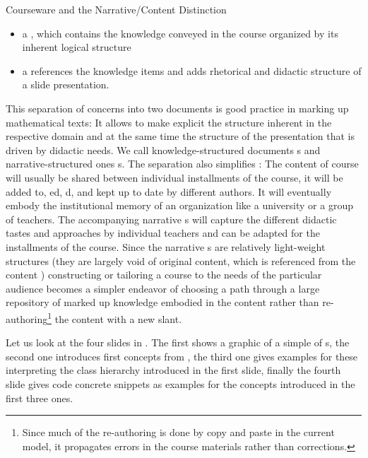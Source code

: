 \begin{omgroup}[id=courseware]{Courseware and the Narrative/Content Distinction}
\begin{itemize}
\item a {\emph{}}, which contains
  the knowledge conveyed in the course organized by its inherent logical structure
\item a {\emph{}}
  references the knowledge items and adds rhetorical and didactic structure of a
  slide presentation.
\end{itemize}
This separation of concerns into two documents is good practice in marking up mathematical
texts: It allows to make explicit the structure inherent in the respective domain and at
the same time the structure of the presentation that is driven by didactic needs.  We call
knowledge-structured documents {s} and narrative-structured ones
{s}.  The separation also simplifies : The content {\omdoc} of course will usually be
shared between individual installments of the course, it will be added to,
{ed}, {d}, and kept up to date by different
authors. It will eventually embody the institutional memory of an organization like a
university or a group of teachers.  The accompanying narrative {\omdoc}s will capture the
different didactic tastes and approaches by individual teachers and can be adapted for the
installments of the course. Since the narrative {\omdoc}s are relatively light-weight
structures (they are largely void of original content, which is referenced from the
content {\omdoc}) constructing or tailoring a course to the needs of the particular
audience becomes a simpler endeavor of choosing a path through a large repository of
marked up knowledge embodied in the content {\omdoc} rather than
re-authoring\footnote{Since much of the re-authoring is done by copy and paste in the
  current model, it propagates errors in the course materials rather than corrections.}
the content with a new slant.

Let us look at the four slides in {}. The first
{} shows a graphic of a simple {} of
{s}, the second one introduces first concepts from
{}, the
third one gives examples for these interpreting the class hierarchy introduced in
the first slide, finally the fourth slide gives code concrete snippets as examples
for the concepts introduced in the first three ones.


\end{omgroup}
